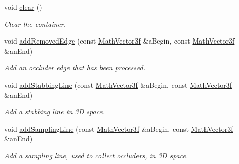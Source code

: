 \begin{DoxyCompactItemize}
\item 
\mbox{\label{classvisilib_1_1_helper_visual_debugger_a1e1fdc98ebf978b83785e508ddaed3f4}} 
void \mbox{\hyperlink{classvisilib_1_1_helper_visual_debugger_a1e1fdc98ebf978b83785e508ddaed3f4}{clear}} ()
\begin{DoxyCompactList}\small\item\em Clear the container. \end{DoxyCompactList}\item 
\mbox{\label{classvisilib_1_1_helper_visual_debugger_aff3c8cf06f92da983c9de380e58817c4}} 
void \mbox{\hyperlink{classvisilib_1_1_helper_visual_debugger_aff3c8cf06f92da983c9de380e58817c4}{add\+Removed\+Edge}} (const \mbox{\hyperlink{classvisilib_1_1_math_vector3__}{Math\+Vector3f}} \&a\+Begin, const \mbox{\hyperlink{classvisilib_1_1_math_vector3__}{Math\+Vector3f}} \&an\+End)
\begin{DoxyCompactList}\small\item\em Add an occluder edge that has been processed. \end{DoxyCompactList}\item 
\mbox{\label{classvisilib_1_1_helper_visual_debugger_a60c0d6368a506b0a352b0ca5bc2e1255}} 
void \mbox{\hyperlink{classvisilib_1_1_helper_visual_debugger_a60c0d6368a506b0a352b0ca5bc2e1255}{add\+Stabbing\+Line}} (const \mbox{\hyperlink{classvisilib_1_1_math_vector3__}{Math\+Vector3f}} \&a\+Begin, const \mbox{\hyperlink{classvisilib_1_1_math_vector3__}{Math\+Vector3f}} \&an\+End)
\begin{DoxyCompactList}\small\item\em Add a stabbing line in 3D space. \end{DoxyCompactList}\item 
\mbox{\label{classvisilib_1_1_helper_visual_debugger_a829462582410bd53ecebfa0ee7bc609a}} 
void \mbox{\hyperlink{classvisilib_1_1_helper_visual_debugger_a829462582410bd53ecebfa0ee7bc609a}{add\+Sampling\+Line}} (const \mbox{\hyperlink{classvisilib_1_1_math_vector3__}{Math\+Vector3f}} \&a\+Begin, const \mbox{\hyperlink{classvisilib_1_1_math_vector3__}{Math\+Vector3f}} \&an\+End)
\begin{DoxyCompactList}\small\item\em Add a sampling line, used to collect occluders, in 3D space. \end{DoxyCompactList}\item 

\end{DoxyCompactItemize}
